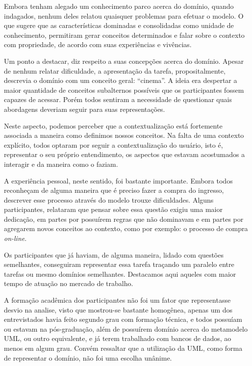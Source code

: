 Embora tenham alegado um conhecimento parco acerca do domínio, quando indagados, nenhum deles relatou quaisquer problemas para efetuar o modelo. O que sugere que as características dominadas e consolidadas como unidade de conhecimento, permitiram gerar conceitos determinados e falar sobre o contexto com propriedade, de acordo com suas experiências e vivências.

Um ponto a destacar, diz respeito a suas concepções acerca do domínio. Apesar de nenhum relatar dificuldade, a apresentação da tarefa, propositalmente, descrevia o domínio com um conceito geral: ``cinema''. A ideia era despertar a maior quantidade de conceitos subalternos possíveis que os participantes fossem capazes de acessar. Porém todos sentiram a necessidade de questionar quais abordagens deveriam seguir para suas representações. 

Neste aspecto, podemos perceber que a contextualização está fortemente associada a maneira como definimos nossos conceitos. Na falta de uma contexto explícito, todos optaram por seguir a contextualização do usuário, isto é, representar o seu próprio entendimento, os aspectos que estavam acostumados a interagir e da maneira como o faziam.

A experiência pessoal, neste sentido, foi bastante importante. Embora todos reconheçam de alguma maneira que é preciso fazer a compra do ingresso, descrever esse processo através do modelo trouxe dificuldades. Alguns participantes, relataram que pensar sobre essa questão exigiu uma maior dedicação, em partes por possuírem regras que não dominavam e em partes por agregarem novos conceitos ao contexto, como por exemplo: o processo de compra \textit{on-line}.

Os participantes que já haviam, de alguma maneira, lidado com questões semelhantes, conseguiram representar essa tarefa traçando um paralelo entre tarefas ou mesmo domínios semelhantes. Destacamos aqui aqueles com maior tempo de atuação no mercado de trabalho.

A formação acadêmica dos participantes não foi um fator que representasse desvio na analise, visto que mostrou-se bastante homogênea, apenas um dos entrevistados havia feito segundo grau com formação técnica, e todos possuíam ou estavam na pós-graduação, além de possuírem domínio acerca do metamodelo UML, ou outro equivalente, e já terem trabalhado com bancos de dados, ao menos em algum grau. Convém ressaltar que a utilização da UML, como forma de representar o domínio, não foi uma escolha unânime.

